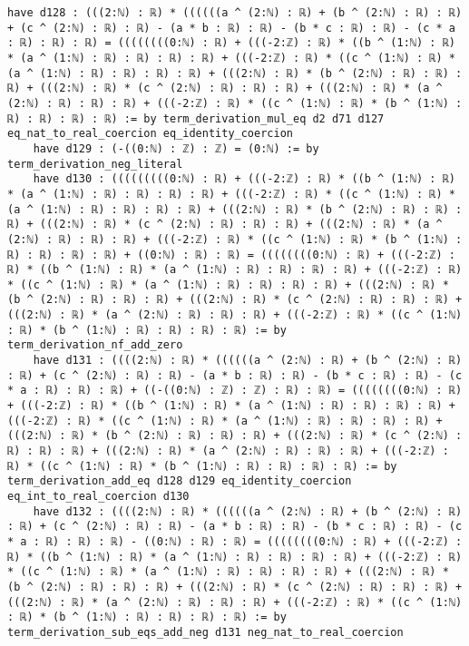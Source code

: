 \documentclass{article}
\begin{document}
\begin{tcolorbox}[colback=white!10, width=\linewidth]
\begin{lstlisting}[language=Lean4]
    have d128 : (((2:ℕ) : ℝ) * ((((((a ^ (2:ℕ) : ℝ) + (b ^ (2:ℕ) : ℝ) : ℝ) + (c ^ (2:ℕ) : ℝ) : ℝ) - (a * b : ℝ) : ℝ) - (b * c : ℝ) : ℝ) - (c * a : ℝ) : ℝ) : ℝ) = ((((((((0:ℕ) : ℝ) + (((-2:ℤ) : ℝ) * ((b ^ (1:ℕ) : ℝ) * (a ^ (1:ℕ) : ℝ) : ℝ) : ℝ) : ℝ) + (((-2:ℤ) : ℝ) * ((c ^ (1:ℕ) : ℝ) * (a ^ (1:ℕ) : ℝ) : ℝ) : ℝ) : ℝ) + (((2:ℕ) : ℝ) * (b ^ (2:ℕ) : ℝ) : ℝ) : ℝ) + (((2:ℕ) : ℝ) * (c ^ (2:ℕ) : ℝ) : ℝ) : ℝ) + (((2:ℕ) : ℝ) * (a ^ (2:ℕ) : ℝ) : ℝ) : ℝ) + (((-2:ℤ) : ℝ) * ((c ^ (1:ℕ) : ℝ) * (b ^ (1:ℕ) : ℝ) : ℝ) : ℝ) : ℝ) := by term_derivation_mul_eq d2 d71 d127 eq_nat_to_real_coercion eq_identity_coercion
    have d129 : (-((0:ℕ) : ℤ) : ℤ) = (0:ℕ) := by term_derivation_neg_literal
    have d130 : (((((((((0:ℕ) : ℝ) + (((-2:ℤ) : ℝ) * ((b ^ (1:ℕ) : ℝ) * (a ^ (1:ℕ) : ℝ) : ℝ) : ℝ) : ℝ) + (((-2:ℤ) : ℝ) * ((c ^ (1:ℕ) : ℝ) * (a ^ (1:ℕ) : ℝ) : ℝ) : ℝ) : ℝ) + (((2:ℕ) : ℝ) * (b ^ (2:ℕ) : ℝ) : ℝ) : ℝ) + (((2:ℕ) : ℝ) * (c ^ (2:ℕ) : ℝ) : ℝ) : ℝ) + (((2:ℕ) : ℝ) * (a ^ (2:ℕ) : ℝ) : ℝ) : ℝ) + (((-2:ℤ) : ℝ) * ((c ^ (1:ℕ) : ℝ) * (b ^ (1:ℕ) : ℝ) : ℝ) : ℝ) : ℝ) + ((0:ℕ) : ℝ) : ℝ) = ((((((((0:ℕ) : ℝ) + (((-2:ℤ) : ℝ) * ((b ^ (1:ℕ) : ℝ) * (a ^ (1:ℕ) : ℝ) : ℝ) : ℝ) : ℝ) + (((-2:ℤ) : ℝ) * ((c ^ (1:ℕ) : ℝ) * (a ^ (1:ℕ) : ℝ) : ℝ) : ℝ) : ℝ) + (((2:ℕ) : ℝ) * (b ^ (2:ℕ) : ℝ) : ℝ) : ℝ) + (((2:ℕ) : ℝ) * (c ^ (2:ℕ) : ℝ) : ℝ) : ℝ) + (((2:ℕ) : ℝ) * (a ^ (2:ℕ) : ℝ) : ℝ) : ℝ) + (((-2:ℤ) : ℝ) * ((c ^ (1:ℕ) : ℝ) * (b ^ (1:ℕ) : ℝ) : ℝ) : ℝ) : ℝ) := by term_derivation_nf_add_zero
    have d131 : ((((2:ℕ) : ℝ) * ((((((a ^ (2:ℕ) : ℝ) + (b ^ (2:ℕ) : ℝ) : ℝ) + (c ^ (2:ℕ) : ℝ) : ℝ) - (a * b : ℝ) : ℝ) - (b * c : ℝ) : ℝ) - (c * a : ℝ) : ℝ) : ℝ) + ((-((0:ℕ) : ℤ) : ℤ) : ℝ) : ℝ) = ((((((((0:ℕ) : ℝ) + (((-2:ℤ) : ℝ) * ((b ^ (1:ℕ) : ℝ) * (a ^ (1:ℕ) : ℝ) : ℝ) : ℝ) : ℝ) + (((-2:ℤ) : ℝ) * ((c ^ (1:ℕ) : ℝ) * (a ^ (1:ℕ) : ℝ) : ℝ) : ℝ) : ℝ) + (((2:ℕ) : ℝ) * (b ^ (2:ℕ) : ℝ) : ℝ) : ℝ) + (((2:ℕ) : ℝ) * (c ^ (2:ℕ) : ℝ) : ℝ) : ℝ) + (((2:ℕ) : ℝ) * (a ^ (2:ℕ) : ℝ) : ℝ) : ℝ) + (((-2:ℤ) : ℝ) * ((c ^ (1:ℕ) : ℝ) * (b ^ (1:ℕ) : ℝ) : ℝ) : ℝ) : ℝ) := by term_derivation_add_eq d128 d129 eq_identity_coercion eq_int_to_real_coercion d130
    have d132 : ((((2:ℕ) : ℝ) * ((((((a ^ (2:ℕ) : ℝ) + (b ^ (2:ℕ) : ℝ) : ℝ) + (c ^ (2:ℕ) : ℝ) : ℝ) - (a * b : ℝ) : ℝ) - (b * c : ℝ) : ℝ) - (c * a : ℝ) : ℝ) : ℝ) - ((0:ℕ) : ℝ) : ℝ) = ((((((((0:ℕ) : ℝ) + (((-2:ℤ) : ℝ) * ((b ^ (1:ℕ) : ℝ) * (a ^ (1:ℕ) : ℝ) : ℝ) : ℝ) : ℝ) + (((-2:ℤ) : ℝ) * ((c ^ (1:ℕ) : ℝ) * (a ^ (1:ℕ) : ℝ) : ℝ) : ℝ) : ℝ) + (((2:ℕ) : ℝ) * (b ^ (2:ℕ) : ℝ) : ℝ) : ℝ) + (((2:ℕ) : ℝ) * (c ^ (2:ℕ) : ℝ) : ℝ) : ℝ) + (((2:ℕ) : ℝ) * (a ^ (2:ℕ) : ℝ) : ℝ) : ℝ) + (((-2:ℤ) : ℝ) * ((c ^ (1:ℕ) : ℝ) * (b ^ (1:ℕ) : ℝ) : ℝ) : ℝ) : ℝ) := by term_derivation_sub_eqs_add_neg d131 neg_nat_to_real_coercion

\end{lstlisting}
\end{tcolorbox}
\end{document}

